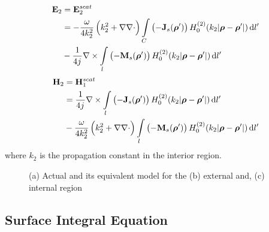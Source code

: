%
\begin{equation}
  \begin{split}
    \mathbf{E}_2 &= \mathbf{E}_2^{scat} \\
    &=  -\frac{\omega}{4 k_2^2} \left( k_2^2 + \nabla \nabla \cdot \right) \int\limits_{C} \left(-\mathbf{J}_s(\boldsymbol {\rho}')\right) H_0^{(2)}(k_2 |\boldsymbol {\rho} - \boldsymbol {\rho}'|) \mathop{}\!\mathrm{d}{l'} \\
    &- \frac{1}{4 {j}\mkern1mu} \nabla \times \int\limits_{l} \left(-\mathbf{M}_s(\boldsymbol {\rho}')\right) H_0^{(2)}(k_2 |\boldsymbol {\rho} - \boldsymbol {\rho}'|) \mathop{}\!\mathrm{d}{l'}
  \end{split}
  \label{eq:E2scatt}
\end{equation}
%
\begin{equation}
  \begin{split}
    \mathbf{H}_2 &= \mathbf{H}_1^{scat} \\
    &= \frac{1}{4 {j}\mkern1mu} \nabla \times \int\limits_{l} \left(-\mathbf{J}_s(\boldsymbol {\rho}')\right) H_0^{(2)}(k_2 |\boldsymbol {\rho} - \boldsymbol {\rho}'|) \mathop{}\!\mathrm{d}{l'} \\
    &-\frac{\omega}{4 k_2^2} \left( k_2^2 + \nabla \nabla \cdot \right) \int\limits_{l} \left(-\mathbf{M}_s(\boldsymbol {\rho}')\right) H_0^{(2)}(k_2 |\boldsymbol {\rho} - \boldsymbol {\rho}'|) \mathop{}\!\mathrm{d}{l'}
  \end{split}
  \label{eq:H2scatt}
\end{equation}
%
where $k_2$ is the propagation constant in the interior region.
%
\begin{figure}[b!]
  \centering
  \def\svgwidth{1\linewidth}
  
  \caption{(a) Actual and its equivalent model for the (b) external and, (c) internal region}
  \label{fig:surfeq}
\end{figure}

\subsection{Surface Integral Equation}
%
